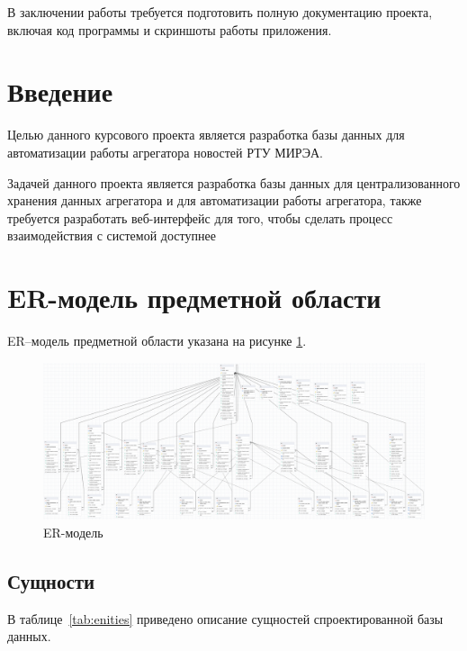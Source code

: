 \documentclass{mirea}
\begin{document}
	В заключении работы требуется подготовить полную документацию проекта, включая код программы и скриншоты работы приложения.
	
	
	\section*{Введение}
	
	Целью данного курсового проекта является разработка базы данных для автоматизации работы агрегатора новостей РТУ МИРЭА.
	
	Задачей данного проекта является разработка базы данных для централизованного хранения данных агрегатора и для автоматизации работы агрегатора, также требуется разработать веб-интерфейс для того, чтобы сделать процесс взаимодействия с системой доступнее
	
	
	\section{ER-модель предметной области}
	
	ER–модель предметной области указана на рисунке \ref{fig:er}.
	
	\begin{figure}[H]
		\centering
		\includegraphics[width=\textwidth]{er}
		\parskip=6pt
		\caption{ER-модель}
		\label{fig:er}
	\end{figure}
	
	\subsection{Сущности}
	
	В таблице~\ref{tab:enities} приведено описание сущностей спроектированной базы
	данных.
	
\end{document}
